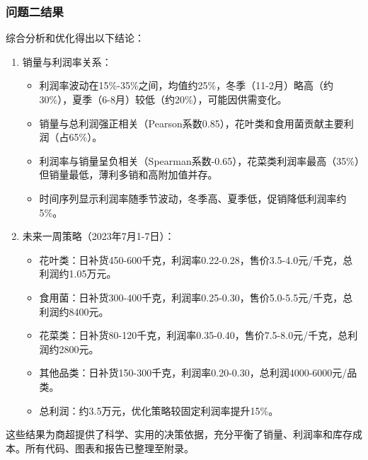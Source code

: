 \documentclass{cumcmthesis} %
\begin{document}

\subsubsection{问题二结果}
综合分析和优化得出以下结论：
\begin{enumerate}
    \item 销量与利润率关系：
    \begin{itemize}
    
        \item 利润率波动在15\%-35\%之间，均值约25\%，冬季（11-2月）略高（约30\%），夏季（6-8月）较低（约20\%），可能因供需变化。
        \item 销量与总利润强正相关（Pearson系数0.85），花叶类和食用菌贡献主要利润（占65\%）。
        \item 利润率与销量呈负相关（Spearman系数-0.65），花菜类利润率最高（35\%）但销量最低，薄利多销和高附加值并存。
        \item 时间序列显示利润率随季节波动，冬季高、夏季低，促销降低利润率约5\%。
    \end{itemize}
    
    
    \item 未来一周策略（2023年7月1-7日）：
     
    \begin{itemize}
        \item 花叶类：日补货450-600千克，利润率0.22-0.28，售价3.5-4.0元/千克，总利润约1.05万元。
        \item 食用菌：日补货300-400千克，利润率0.25-0.30，售价5.0-5.5元/千克，总利润约8400元。
        \item 花菜类：日补货80-120千克，利润率0.35-0.40，售价7.5-8.0元/千克，总利润约2800元。
        \item 其他品类：日补货150-300千克，利润率0.20-0.30，总利润4000-6000元/品类。
        \item 总利润：约3.5万元，优化策略较固定利润率提升15\%。
    \end{itemize}
\end{enumerate}
 这些结果为商超提供了科学、实用的决策依据，充分平衡了销量、利润率和库存成本。所有代码、图表和报告已整理至附录。
\end{document}
